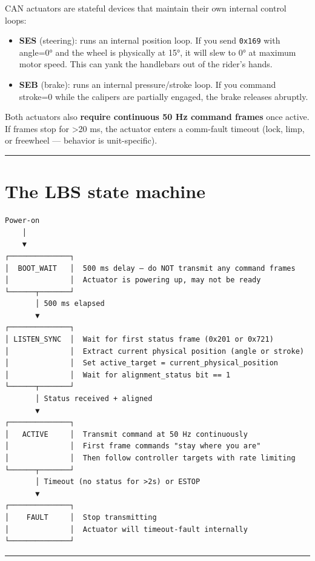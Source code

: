 \documentclass[12pt,a4paper,oneside]{report}
\providecommand{\tightlist}{\setlength{\itemsep}{0pt}\setlength{\parskip}{0pt}}
\begin{document}
CAN actuators are stateful devices that maintain their own internal control
loops:

\begin{itemize}
\tightlist
\item
  \textbf{SES} (steering): runs an internal position loop. If you send
  \texttt{0x169} with angle=0° and the wheel is physically at 15°, it will slew
  to 0° at maximum motor speed. This can yank the handlebars out of the rider's
  hands.
\item
  \textbf{SEB} (brake): runs an internal pressure/stroke loop. If you command
  stroke=0 while the calipers are partially engaged, the brake releases
  abruptly.
\end{itemize}

Both actuators also \textbf{require continuous 50 Hz command frames} once
active. If frames stop for \textgreater20 ms, the actuator enters a comm-fault
timeout (lock, limp, or freewheel --- behavior is unit-specific).

\begin{center}\rule{0.5\linewidth}{0.5pt}\end{center}

\section{The LBS state machine}\label{the-lbs-state-machine}

\begin{verbatim}
Power-on
    │
    ▼
┌──────────────┐
│  BOOT_WAIT   │  500 ms delay — do NOT transmit any command frames
│              │  Actuator is powering up, may not be ready
└──────┬───────┘
       │ 500 ms elapsed
       ▼
┌──────────────┐
│ LISTEN_SYNC  │  Wait for first status frame (0x201 or 0x721)
│              │  Extract current physical position (angle or stroke)
│              │  Set active_target = current_physical_position
│              │  Wait for alignment_status bit == 1
└──────┬───────┘
       │ Status received + aligned
       ▼
┌──────────────┐
│   ACTIVE     │  Transmit command at 50 Hz continuously
│              │  First frame commands "stay where you are"
│              │  Then follow controller targets with rate limiting
└──────┬───────┘
       │ Timeout (no status for >2s) or ESTOP
       ▼
┌──────────────┐
│    FAULT     │  Stop transmitting
│              │  Actuator will timeout-fault internally
└──────────────┘
\end{verbatim}

\begin{center}\rule{0.5\linewidth}{0.5pt}\end{center}
\end{document}
